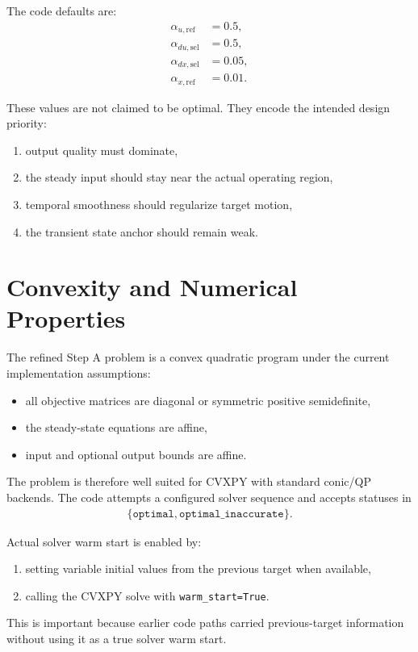 \documentclass[11pt]{article}
\begin{document}
The code defaults are:
\begin{align}
\alpha_{u,\mathrm{ref}} &= 0.5, \\
\alpha_{du,\mathrm{sel}} &= 0.5, \\
\alpha_{dx,\mathrm{sel}} &= 0.05, \\
\alpha_{x,\mathrm{ref}} &= 0.01.
\end{align}

These values are not claimed to be optimal. They encode the intended design priority:
\begin{enumerate}[label=\arabic*.]
\item output quality must dominate,
\item the steady input should stay near the actual operating region,
\item temporal smoothness should regularize target motion,
\item the transient state anchor should remain weak.
\end{enumerate}

\section{Convexity and Numerical Properties}
The refined Step A problem is a convex quadratic program under the current implementation assumptions:
\begin{itemize}
\item all objective matrices are diagonal or symmetric positive semidefinite,
\item the steady-state equations are affine,
\item input and optional output bounds are affine.
\end{itemize}

The problem is therefore well suited for CVXPY with standard conic/QP backends. The code attempts a configured solver sequence and accepts statuses in
\begin{align}
\{\texttt{optimal},\texttt{optimal\_inaccurate}\}.
\end{align}

Actual solver warm start is enabled by:
\begin{enumerate}[label=\alph*)]
\item setting variable initial values from the previous target when available,
\item calling the CVXPY solve with \texttt{warm\_start=True}.
\end{enumerate}

This is important because earlier code paths carried previous-target information without using it as a true solver warm start.
\end{document}
